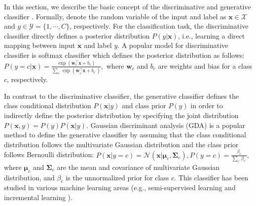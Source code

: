 \documentclass{article}
\begin{document}
In this section, we describe the basic concept of the discriminative and generative classifier \citep{murphy2012machine}.
Formally, denote the random variable of the input and label as $\mathbf{x}\in \mathcal{X}$ and $y \in \mathcal{Y} = \{1,\cdots,C\}$, respectively.
For the classification task,
the discriminative classifier directly defines a posterior distribution $P(y|\mathbf{x})$, i.e., learning a direct mapping between input $\mathbf{x}$ and label $y$. A popular model for discriminative classifier is softmax classifier which defines the posterior distribution as follows:
$P\left(y=c|\mathbf{x}\right) = \frac{ \exp \left( \mathbf{w}_c^\top \mathbf{x} + b_c \right) }{\sum_{c^\prime} \exp \left( \mathbf{w}_{c^\prime}^\top \mathbf{x} + b_{c^\prime}\right) },$ 
where $\mathbf{w}_c$ and $b_c$ are weights and bias for a class $c$, respectively. 
\iffalse
\textcolor{blue}{
We remark that the softmax classifier with DNNs has become a standard in various classification tasks \citep{he2016deep, amodei2016deep} since it shows the state-of-the-art performance.}
\fi
In contrast to the discriminative classifier, the generative classifier defines the class conditional distribution $P\left( \mathbf{x}|y\right)$ and class prior $P\left( y \right)$ in order to indirectly define the posterior distribution by specifying the joint distribution $P\left(\mathbf{x}, y\right) = P\left( y \right) P \left( \mathbf{x}| y \right)$.
Gaussian discriminant analysis (GDA) is a popular method to define the generative classifier by assuming that
the class conditional distribution follows the multivariate Gaussian distribution and the class prior follows Bernoulli distribution:
$P\left( \mathbf{x}|y=c\right) = \mathcal{N} \left(\mathbf{x}| \mathbf{\mu}_c, \mathbf{\Sigma}_c \right),
P\left( y=c\right) = \frac{\beta_c}{\sum_{c^\prime} \beta_{c^\prime}},$
where $\mathbf{\mu}_c$ and $\mathbf{\Sigma}_c$ are the mean and covariance of multivariate Gaussian distribution, and $\beta_c$ is the unnormalized prior for class $c$.
This classifier has been studied in various machine learning areas (e.g., semi-supervised learning \citep{lasserre2006principled} and incremental learning \citep{rebuffi2017icarl}).
\end{document}
